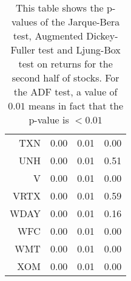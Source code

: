 \begin{table}[ht]
\begin{tabular}{rrrr}
  TXN & 0.00 & 0.01 & 0.00 \\ 
  UNH & 0.00 & 0.01 & 0.51 \\ 
  V & 0.00 & 0.01 & 0.00 \\ 
  VRTX & 0.00 & 0.01 & 0.59 \\ 
  WDAY & 0.00 & 0.01 & 0.16 \\ 
  WFC & 0.00 & 0.01 & 0.00 \\ 
  WMT & 0.00 & 0.01 & 0.00 \\ 
  XOM & 0.00 & 0.01 & 0.00 \\ 
   \hline
\end{tabular}
\caption[JB test, ADF test, LB text on returns. (2)]{This table shows the p-values of the Jarque-Bera test, Augmented Dickey-Fuller test and Ljung-Box test 
                     on returns for the second half of stocks. For the ADF test, a value of $0.01$ means in fact that the p-value is $<0.01$} 
\label{Table:Rets_p_vals_2}
\end{table}
